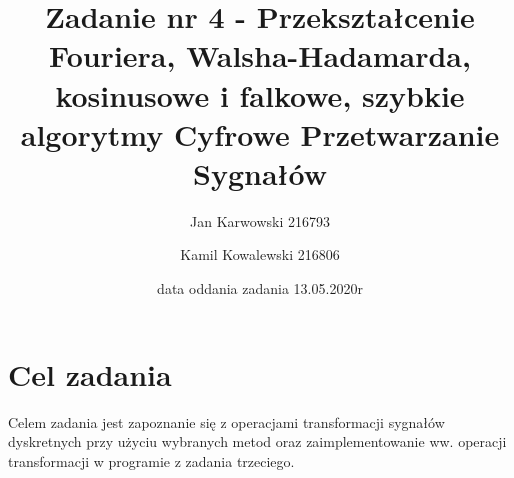 \documentclass[12pt]{article}
\title{{\bf Zadanie nr 4 - Przekształcenie Fouriera, Walsha-Hadamarda,
kosinusowe i falkowe, szybkie algorytmy}\linebreak
    Cyfrowe Przetwarzanie Sygnałów}
\author{Jan Karwowski 216793 \and Kamil Kowalewski 216806}
\date{data oddania zadania 13.05.2020r}
\begin{document}
    \clearpage\maketitle
    \thispagestyle{empty}
    \newpage
    \setcounter{page}{1}
    \section{Cel zadania} {
        Celem zadania jest zapoznanie się z operacjami transformacji sygnałów dyskretnych
        przy użyciu wybranych metod oraz zaimplementowanie ww. operacji transformacji
        w programie z zadania trzeciego.
    }
\end{document}
